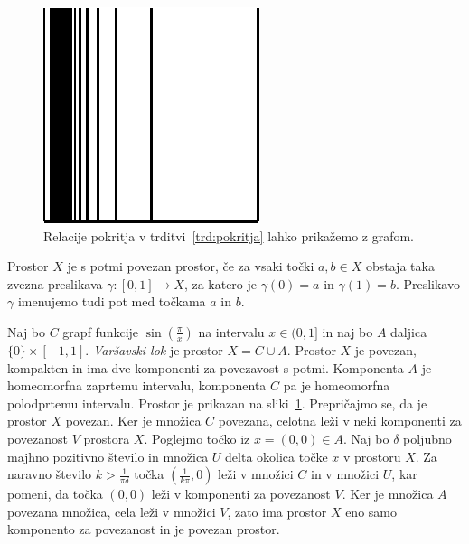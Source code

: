 \documentclass[../TG_magistrsko_delo_sections.tex]{subfiles}
\begin{document}
\begin{figure}[h]
  \centering
  \includegraphics{glavnik.pdf}
  \caption[Primer vektorske slike.]{Relacije pokritja v trditvi~\ref{trd:pokritja} lahko prikažemo z grafom.}
  \label{fig:varsavski_lok}
\end{figure}

\begin{definicija}
Prostor $X$ je s potmi povezan prostor, če za vsaki točki $a, b \in X$ obstaja taka zvezna preslikava $\gamma : [0, 1] \to X$, za katero je $\gamma(0) = a$ in $\gamma(1) = b$. Preslikavo $\gamma$ imenujemo tudi pot med točkama $a$ in $b$.
\end{definicija}

\begin{primer}
Naj bo $C$ grapf funkcije $\sin\left(\frac{\pi}{x}\right)$ na intervalu $x \in (0 , 1]$ in naj bo $A$ daljica $\{ 0 \} \times [-1 , 1]$. \emph{Varšavski lok} je prostor $X = C \cup A$.
Prostor $X$ je povezan, kompakten in ima dve komponenti za povezavost s potmi. Komponenta $A$ je homeomorfna zaprtemu intervalu, komponenta $C$ pa je homeomorfna polodprtemu intervalu. Prostor je prikazan na sliki~\ref{fig:varsavski_lok}.
Prepričajmo se, da je prostor $X$ povezan. Ker je množica $C$ povezana, celotna leži v neki komponenti za povezanost $V$ prostora $X$. Poglejmo točko iz $x = (0, 0) \in  A$. Naj bo $\delta$ poljubno majhno pozitivno število in množica $U$ delta okolica točke $x$ v prostoru $X$. Za naravno število $k > \frac{1}{\pi \delta}$ točka $(\frac{1}{k \pi}, 0)$ leži v množici $C$ in v množici $U$, kar pomeni, da točka $(0, 0)$ leži v komponenti za povezanost $V$. Ker je množica $A$ povezana množica, cela leži v množici $V$, zato ima prostor $X$ eno samo komponento za povezanost in je povezan prostor.
\end{primer}
\end{document}
